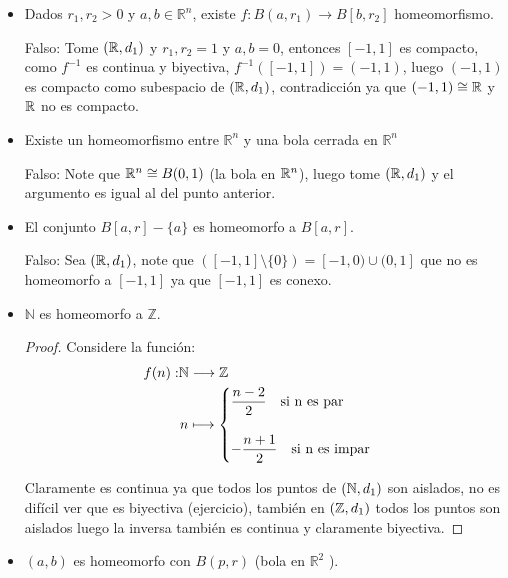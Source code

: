 \begin{itemize}[label={✎},leftmargin=*]
    \item Dados $r_1, r_2>0$ y $a, b \in \mathbb{R}^n$, existe $f: B\left(a, r_1\right) \rightarrow B\left[b, r_2\right]$ homeomorfismo.

Falso: Tome $(\mathbb{R},d_1)$ y $r_1,r_2=1$ y $a,b=0$, entonces $[-1,1]$ es compacto, como $f^{-1}$ es continua y biyectiva, $f^{-1}([-1,1])=(-1,1)$, luego $(-1,1)$ es compacto como subespacio de $(\mathbb{R},d_1)$, contradicción ya que $(-1,1)\cong \mathbb{R}$ y $\mathbb{R}$ no es compacto. 

\item Existe un homeomorfismo entre $\mathbb{R}^n$ y una bola cerrada en $\mathbb{R}^n$

Falso: Note que $\mathbb{R}^n\cong B(0,1)$ (la bola en $\mathbb{R}^n$), luego tome $(\mathbb{R},d_1)$ y el argumento es igual al del punto anterior. 

\item El conjunto $B[a, r]-\{a\}$ es homeomorfo a $B[a, r]$.

Falso: Sea $(\mathbb{R},d_1)$, note que $([-1,1]\setminus \{0\})=[-1,0)\cup(0,1]$ que no es homeomorfo a $[-1,1]$ ya que $[-1,1]$ es conexo.

\item $\mathbb{N}$ es homeomorfo a $\mathbb{Z}$.\\

\begin{proof}
Considere la función:
\begin{align*}
    f(n): &\N \longrightarrow \Z\\
    &\hspace{0.03cm}n \longmapsto \begin{cases}
\dfrac{n-2}{2} \quad \text{si } $n$ \text{ es par}\\\\
-\dfrac{n+1}{2} \quad \text{si } $n$ \text{ es impar}
\end{cases}
\end{align*}

Claramente es continua ya que todos los puntos de $(\mathbb{N},d_1)$ son aislados, no es difícil ver que es biyectiva (ejercicio), también en $(\mathbb{Z},d_1)$ todos los puntos son aislados luego la inversa también es continua y claramente biyectiva.

\end{proof}

\item  $(a, b)$ es homeomorfo con $B(p, r)$ (bola en $\mathbb{R}^2$ ).


\end{itemize}
